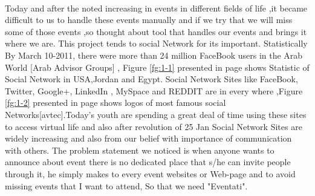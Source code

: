 \documentclass[12pt,a4paper,class,twoside,openany]{report}
\begin{document}
 \paragraph*{\hspace{.9 cm} } Today  and after the noted  increasing in  events  in different fields of life  ,it became difficult to us to handle  these  events  manually and if  we try  that  we will miss some of  those events ,so  thought about tool that handles our events and brings it where we are. This project tends to social Network for its important. Statistically By March 10-2011, there were more than 24 million FaceBook users in the Arab World [Arab Advisor Groups] , Figure \ref{fg:1-1} presented in page \pageref{fg:1-1} shows Statistic of Social Network in USA,Jordan and Egypt. Social Network Sites like  FaceBook, Twitter, Google+, LinkedIn , MySpace and REDDIT are in every where ,Figure \ref{fg:1-2} presented in page \pageref{fg:1-2} shows logos of most famous  social Networks[avtec].Today’s youth are spending a great deal of time using these sites to access virtual life and also after revolution of 25 Jan Social Network Sites are widely increasing and also from  our belief with  importance of communication with others. The problem statement we noticed is when anyone wants to announce about event there is no dedicated place that s/he can invite people through it, he simply makes to every event websites or Web-page and to avoid missing events that I want to attend, So that we need "Eventati".    
  
\end{document}
